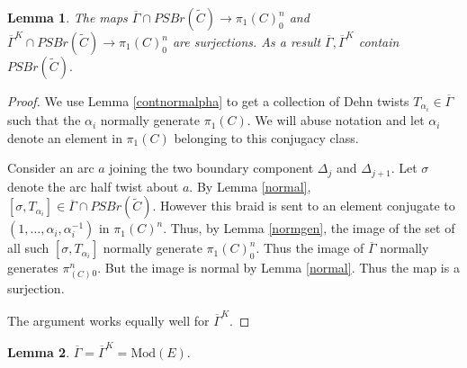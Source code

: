 \documentclass{article}
\newcommand{\Mod}{\textrm{Mod}}
\newtheorem{lemma}{Lemma}[theorem]
\begin{document}
\begin{lemma}\label{contpsbr}
 The maps  $\overline{\Gamma} \cap PSBr(\tilde C) \to \pi_1(C)^n_0$  and $\overline{\Gamma}^K \cap PSBr(\tilde C) \to \pi_1(C)^n_0$ are surjections. As a result $\overline{\Gamma}, \overline{\Gamma}^K$ contain $PSBr(\tilde C).$
\end{lemma}
\begin{proof}
     We use Lemma \ref{contnormalpha} to get a collection of Dehn twists $T_{\alpha_i} \in \overline{\Gamma} $ such that the $\alpha_i$ normally generate $\pi_1(C)$.  We will abuse notation and let $\alpha_i$ denote an element in $\pi_1(C)$ belonging to this conjugacy class.
    
    Consider an arc $a$ joining the two boundary component $\Delta_j$ and $\Delta_{j+1}.$ Let $\sigma$ denote the arc half twist about $a$. By Lemma \ref{normal}, $[\sigma, T_{\alpha_i}] \in \overline {\Gamma} \cap PSBr(\tilde C).$ However this braid is sent to an element conjugate to $(1, \dots,\alpha_i, \alpha_i^{-1} )$  in $\pi_1(C)^n.$ Thus, by Lemma \ref{normgen}, the image of the set of all such $[\sigma, T_{\alpha_i}]$ normally generate $\pi_1(C)^n_0$. Thus the image of $\overline{\Gamma}$ normally generates $\pi_(C)^n_0$. But the image is normal by Lemma \ref{normal}. Thus the map is a surjection. 

    The argument works equally well for $\overline{\Gamma}^K.$
\end{proof}
\begin{lemma}\label{fullclosure}
    $\overline{\Gamma} = \overline{\Gamma}^K =\Mod(E).$
\end{lemma}
\end{document}
